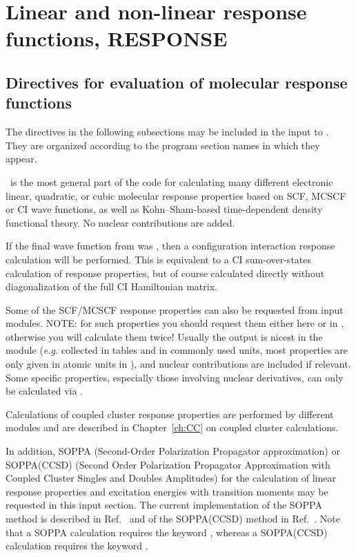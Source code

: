 \chapter{Linear and non-linear response functions, RESPONSE}
\label{ch:response}

\section{Directives for evaluation of molecular response functions}\label{sec:rspinp}

The directives in the following subsections may be included in the input to \resp.
They are organized according to the program section names in which they
appear.

\resp\ is the most general part of the code for calculating 
many different electronic linear, quadratic, or cubic molecular
response properties based on SCF, MCSCF or CI wave functions, as well as Kohn--Sham-based time-dependent density functional theory.
No nuclear contributions are added.

If the final wave function from  was , then
a configuration interaction
response calculation will be performed. 
This is equivalent to a CI sum-over-states
calculation of response properties,
but of course calculated directly without diagonalization of the full
CI Hamiltonian matrix.

Some of the SCF/MCSCF response properties can also be requested
from  input modules.
NOTE: for such properties you should request them either here or
in , otherwise you will calculate them twice!
Usually the output is nicest in
the  module ({\it e.g.\/} collected in tables and in
commonly used units, most properties are only given in atomic
units in \resp), and nuclear contributions are included if relevant.
Some specific properties, especially those involving nuclear derivatives,
can only be calculated via .

Calculations of coupled cluster response properties are performed
by different modules and are described
in Chapter~\ref{ch:CC} on coupled cluster calculations.

In addition, SOPPA
(Second-Order Polarization Propagator 
approximation) or SOPPA(CCSD) (Second Order Polarization
Propagator Approximation with Coupled Cluster Singles and Doubles Amplitudes) 
for the calculation of linear response
properties and excitation energies with transition moments
may be requested in this input section. The current
implementation of the SOPPA method is described 
in Ref.~\cite{mjpekdtehjajjojcp} and of the SOPPA(CCSD) method in 
Ref.~\cite{soppaccsd}. Note that a SOPPA calculation
requires the keyword , whereas a SOPPA(CCSD) calculation requires
the keyword .


